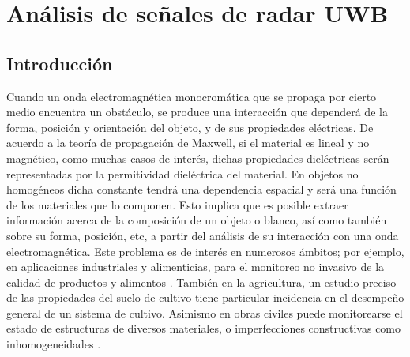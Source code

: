 \chapter{Análisis de señales de radar UWB}\label{chap:sinalUWB}

\section{Introducción}

Cuando un onda electromagnética monocromática que se propaga por cierto medio encuentra un obstáculo, se produce una interacción que dependerá de la forma, posición y orientación del objeto, y de sus propiedades eléctricas. De acuerdo a la teoría de propagación de Maxwell, si el material es lineal y no magnético, como muchas casos de interés, dichas propiedades dieléctricas serán representadas por la permitividad dieléctrica del material. En objetos no homogéneos dicha constante tendrá una dependencia espacial y será una función de los materiales que lo componen. Esto implica que es posible extraer información acerca de la composición de un objeto o blanco, así como también sobre su forma, posición, etc, a partir del análisis de su interacción con una onda electromagnética. Este problema es de interés en numerosos ámbitos; por ejemplo, en aplicaciones industriales y alimenticias, para el monitoreo no invasivo de la calidad de productos y alimentos \cite{Meng2018}. También en la agricultura, un estudio preciso de las propiedades del suelo de cultivo tiene particular incidencia en el desempeño general de un sistema de cultivo. Asimismo en obras civiles puede monitorearse el estado de estructuras de diversos materiales, o imperfecciones constructivas como inhomogeneidades \cite{WAILOKLAI2018}. 

